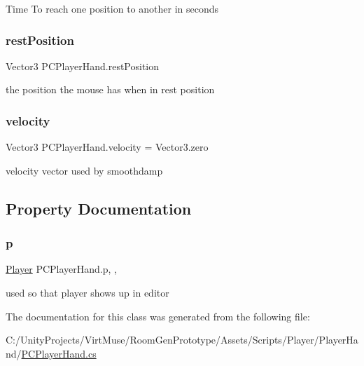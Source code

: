 Time To reach one position to another in seconds 

\mbox{\label{class_p_c_player_hand_a67a82329e791c5fce99188ba601e229d}} 
\subsubsection{\texorpdfstring{rest\+Position}{restPosition}}
{\footnotesize\ttfamily Vector3 P\+C\+Player\+Hand.\+rest\+Position\hspace{0.3cm}{\ttfamily [private]}}



the position the mouse has when in rest position 

\mbox{\label{class_p_c_player_hand_a15c7717a137aa7790c06f2bdf9b247a1}} 
\subsubsection{\texorpdfstring{velocity}{velocity}}
{\footnotesize\ttfamily Vector3 P\+C\+Player\+Hand.\+velocity = Vector3.\+zero\hspace{0.3cm}{\ttfamily [private]}}



velocity vector used by smoothdamp 



\subsection{Property Documentation}
\mbox{\label{class_p_c_player_hand_a8c3efd819803169fc351ce8e456a8a0f}} 
\subsubsection{\texorpdfstring{p}{p}}
{\footnotesize\ttfamily \mbox{\hyperlink{class_player}{Player}} P\+C\+Player\+Hand.\+p\hspace{0.3cm}{\ttfamily [get]}, {\ttfamily [set]}, {\ttfamily [private]}}



used so that player shows up in editor 



The documentation for this class was generated from the following file\+:\begin{DoxyCompactItemize}
\item 
C\+:/\+Unity\+Projects/\+Virt\+Muse/\+Room\+Gen\+Prototype/\+Assets/\+Scripts/\+Player/\+Player\+Hand/\mbox{\hyperlink{_p_c_player_hand_8cs}{P\+C\+Player\+Hand.\+cs}}\end{DoxyCompactItemize}
